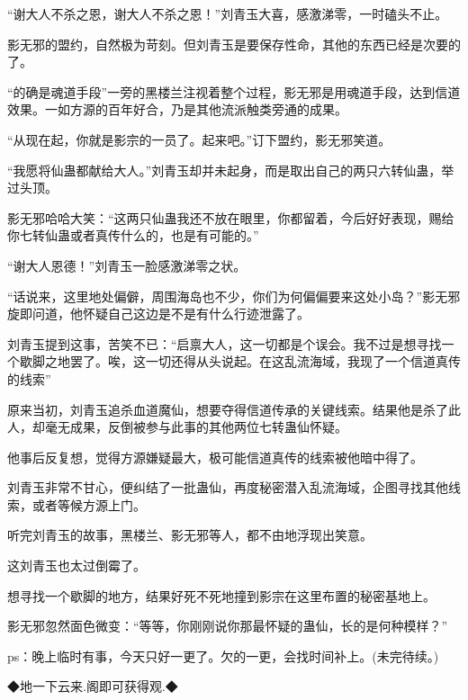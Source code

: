 \begin{this_body}
“谢大人不杀之恩，谢大人不杀之恩！”刘青玉大喜，感激涕零，一时磕头不止。

影无邪的盟约，自然极为苛刻。但刘青玉是要保存性命，其他的东西已经是次要的了。

“的确是魂道手段”一旁的黑楼兰注视着整个过程，影无邪是用魂道手段，达到信道效果。一如方源的百年好合，乃是其他流派触类旁通的成果。

“从现在起，你就是影宗的一员了。起来吧。”订下盟约，影无邪笑道。

“我愿将仙蛊都献给大人。”刘青玉却并未起身，而是取出自己的两只六转仙蛊，举过头顶。

影无邪哈哈大笑：“这两只仙蛊我还不放在眼里，你都留着，今后好好表现，赐给你七转仙蛊或者真传什么的，也是有可能的。”

“谢大人恩德！”刘青玉一脸感激涕零之状。

“话说来，这里地处偏僻，周围海岛也不少，你们为何偏偏要来这处小岛？”影无邪旋即问道，他怀疑自己这边是不是有什么行迹泄露了。

刘青玉提到这事，苦笑不已：“启禀大人，这一切都是个误会。我不过是想寻找一个歇脚之地罢了。唉，这一切还得从头说起。在这乱流海域，我现了一个信道真传的线索”

原来当初，刘青玉追杀血道魔仙，想要夺得信道传承的关键线索。结果他是杀了此人，却毫无成果，反倒被参与此事的其他两位七转蛊仙怀疑。

他事后反复想，觉得方源嫌疑最大，极可能信道真传的线索被他暗中得了。

刘青玉非常不甘心，便纠结了一批蛊仙，再度秘密潜入乱流海域，企图寻找其他线索，或者等候方源上门。

听完刘青玉的故事，黑楼兰、影无邪等人，都不由地浮现出笑意。

这刘青玉也太过倒霉了。

想寻找一个歇脚的地方，结果好死不死地撞到影宗在这里布置的秘密基地上。

影无邪忽然面色微变：“等等，你刚刚说你那最怀疑的蛊仙，长的是何种模样？”

ps：晚上临时有事，今天只好一更了。欠的一更，会找时间补上。(未完待续。)

◆地一下云来.阁即可获得观.◆

\end{this_body}

